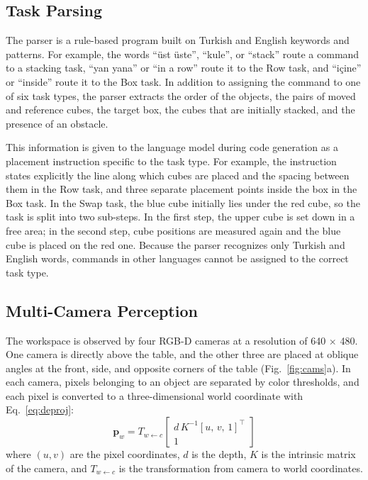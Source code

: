 \documentclass[preprint,12pt]{elsarticle}
\begin{document}
\subsection{Task Parsing}

The parser is a rule-based program built on Turkish and English keywords and patterns. For example, the words ``\"{u}st \"{u}ste'', ``kule'', or ``stack'' route a command to a stacking task, ``yan yana'' or ``in a row'' route it to the Row task, and ``i\c{c}ine'' or ``inside'' route it to the Box task. In addition to assigning the command to one of six task types, the parser extracts the order of the objects, the pairs of moved and reference cubes, the target box, the cubes that are initially stacked, and the presence of an obstacle.

This information is given to the language model during code generation as a placement instruction specific to the task type. For example, the instruction states explicitly the line along which cubes are placed and the spacing between them in the Row task, and three separate placement points inside the box in the Box task. In the Swap task, the blue cube initially lies under the red cube, so the task is split into two sub-steps. In the first step, the upper cube is set down in a free area; in the second step, cube positions are measured again and the blue cube is placed on the red one. Because the parser recognizes only Turkish and English words, commands in other languages cannot be assigned to the correct task type.

\subsection{Multi-Camera Perception}

The workspace is observed by four RGB-D cameras at a resolution of 640 $\times$ 480. One camera is directly above the table, and the other three are placed at oblique angles at the front, side, and opposite corners of the table (Fig.~\ref{fig:cams}a). In each camera, pixels belonging to an object are separated by color thresholds, and each pixel is converted to a three-dimensional world coordinate with Eq.~\eqref{eq:deproj}:
\begin{equation}
\mathbf{p}_w = T_{w \leftarrow c}\begin{bmatrix} d\,K^{-1}[u,\, v,\, 1]^\top \\ 1 \end{bmatrix}
\label{eq:deproj}
\end{equation}
where $(u, v)$ are the pixel coordinates, $d$ is the depth, $K$ is the intrinsic matrix of the camera, and $T_{w \leftarrow c}$ is the transformation from camera to world coordinates.
\end{document}
